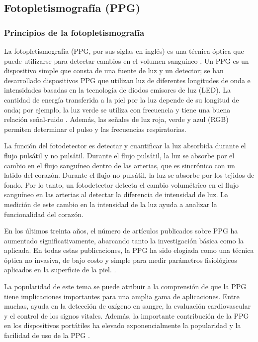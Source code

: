     \subsection{Fotopletismografía (PPG)}
        \subsubsection{Principios de la fotopletismografía}
            La fotopletismografía (PPG, por sus siglas en inglés) es una técnica óptica que puede utilizarse para detectar cambios en el volumen sanguíneo \cite{Hertzman_1938}. Un PPG es un dispositivo simple que consta de una fuente de luz y un detector; se han desarrollado dispositivos PPG que utilizan luz de diferentes longitudes de onda e intensidades basadas en la tecnología de diodos emisores de luz (LED). La cantidad de energía transferida a la piel por la luz depende de su longitud de onda; por ejemplo, la luz verde se utiliza con frecuencia y tiene una buena relación señal-ruido \cite{Challoner_1979}. Además, las señales de luz roja, verde y azul (RGB) permiten determinar el pulso y las frecuencias respiratorias.

            La función del fotodetector es detectar y cuantificar la luz absorbida durante el flujo pulsátil y no pulsátil. Durante el flujo pulsátil, la luz se absorbe por el cambio en el flujo sanguíneo dentro de las arterias, que es sincrónico con un latido del corazón. Durante el flujo no pulsátil, la luz se absorbe por los tejidos de fondo. Por lo tanto, un fotodetector detecta el cambio volumétrico en el flujo sanguíneo en las arterias al detectar la diferencia de intensidad de luz. La medición de este cambio en la intensidad de la luz ayuda a analizar la funcionalidad del corazón.

            En los últimos treinta años, el número de artículos publicados sobre PPG ha aumentado significativamente, abarcando tanto la investigación básica como la aplicada. En todas estas publicaciones, la PPG ha sido elogiada como una técnica óptica no invasiva, de bajo costo y simple para medir parámetros fisiológicos aplicados en la superficie de la piel. \cite{PPG}.

            La popularidad de este tema se puede atribuir a la comprensión de que la PPG tiene implicaciones importantes para una amplia gama de aplicaciones. Entre muchas, ayuda en la detección de oxígeno en sangre, la evaluación cardiovascular y el control de los signos vitales. Además, la importante contribución de la PPG en los dispositivos portátiles ha elevado exponencialmente la popularidad y la facilidad de uso de la PPG \cite{allen_2007}.

